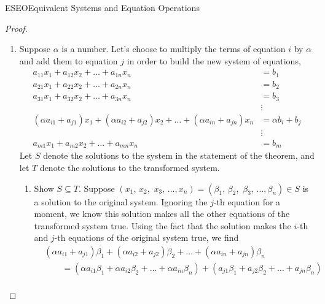 \begin{subsect}{ESEO}{Equivalent Systems and Equation Operations}
\begin{proof}
\begin{para}
\begin{enumerate}
\begin{enumerate}
%
\begin{align*}
\alpha a_{i1}\beta_1+\alpha a_{i2}\beta_2+\alpha a_{i3}\beta_3+\dots+\alpha a_{in}\beta_n&=\alpha b_i
%
\intertext{which we can multiply by $\tfrac{1}{\alpha}$, since $\alpha\neq 0$, to get}
%
a_{i1}\beta_1+a_{i2}\beta_2+a_{i3}\beta_3+\dots+a_{in}\beta_n&=b_i\\
\end{align*}
%
This says that the $i$-th equation of the original system is also true, so we have established that $(\beta_1,\,\beta_2,\,\,\beta_3,\,\ldots,\beta_n)\in S$, and therefore $T\subseteq S$.  Locate the key point where we required that $\alpha\neq 0$, and consider what would happen if $\alpha=0$.
%
\end{enumerate}
\item  Suppose $\alpha$ is a number.  Let's choose to multiply the terms of equation $i$ by $\alpha$ and add them to equation $j$ in order to build the new system of equations,
%
\begin{align*}
a_{11}x_1+a_{12}x_2+\dots+a_{1n}x_n&=b_1\\
a_{21}x_1+a_{22}x_2+\dots+a_{2n}x_n&=b_2\\
a_{31}x_1+a_{32}x_2+\dots+a_{3n}x_n&=b_3\\
&\vdots\\
(\alpha a_{i1}+a_{j1})x_1+(\alpha a_{i2}+a_{j2})x_2+\dots+(\alpha a_{in}+a_{jn})x_n&=\alpha b_i+b_{j}\\
&\vdots\\
a_{m1}x_1+a_{m2}x_2+\dots+a_{mn}x_n&=b_m
\end{align*}
%
Let $S$ denote the solutions to the system in the statement of the theorem, and let $T$ denote the solutions to the transformed system.
\begin{enumerate}
%
\item Show $S\subseteq T$.  Suppose $(x_1,\,x_2,\,\,x_3,\,\ldots,x_n)=(\beta_1,\,\beta_2,\,\,\beta_3,\,\ldots,\beta_n)\in S$ is a solution to the original system.  Ignoring the $j$-th equation for a moment, we know this solution makes all the other equations of the transformed system true.  Using the fact that the solution makes the $i$-th and $j$-th equations of the original system true, we find
%
\begin{align*}
%
&(\alpha a_{i1}+a_{j1})\beta_1+(\alpha a_{i2}+a_{j2})\beta_2+\dots+(\alpha a_{in}+a_{jn})\beta_n\\
%
&\quad\quad=(\alpha a_{i1}\beta_1+\alpha a_{i2}\beta_2+\dots+\alpha a_{in}\beta_n)+
(a_{j1}\beta_1+a_{j2}\beta_2+\dots+a_{jn}\beta_n)\\

\end{align*}
\end{enumerate}
\end{enumerate}
\end{para}
\end{proof}
\end{subsect}
